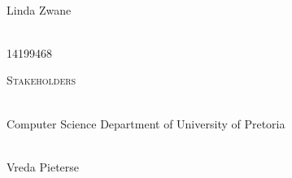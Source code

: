 \begin{titlepage}
\begin{center}
		\begin{minipage}{0.4\textwidth}
			\begin{flushleft} \large
				\emph{} \\
				Linda {Zwane}
			\end{flushleft}
		\end{minipage}
		\begin{minipage}{0.4\textwidth}
			\begin{flushright} \large
				\emph{} \\
				14199468
			\end{flushright}
		\end{minipage}
		
		\textsc{\Large Stakeholders}\\[1cm]	
		
		\begin{minipage}{0.4\textwidth}
			\begin{flushleft} \large
				\emph{} \\
				Computer Science Department of University of Pretoria
			\end{flushleft}
		\end{minipage}
		\begin{minipage}{0.4\textwidth}
			\begin{flushright} \large
				\emph{} \\
				Vreda Pieterse
			\end{flushright}
		\end{minipage}
		
	\end{center}
\end{titlepage}